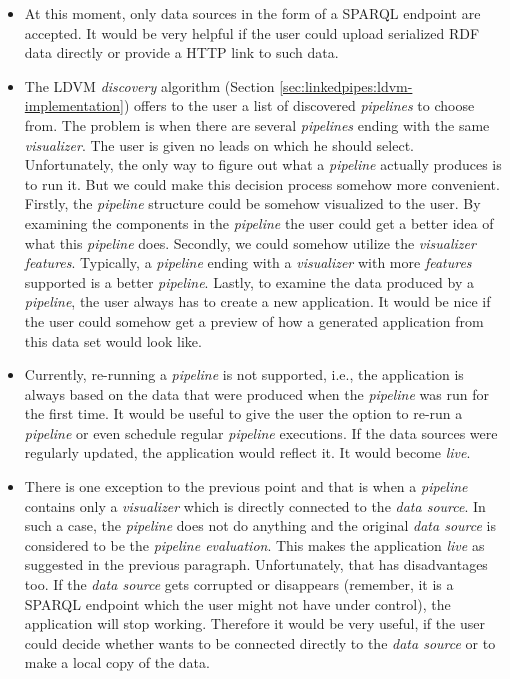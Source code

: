 \begin{itemize}
\item At this moment, only data sources in the form of a SPARQL endpoint are accepted. It would be very helpful if the user could upload serialized RDF data directly or provide a HTTP link to such data.
\item The LDVM \emph{discovery} algorithm (Section \ref{sec:linkedpipes:ldvm-implementation}) offers to the user a list of discovered \emph{pipelines} to choose from. The problem is when there are several \emph{pipelines} ending with the same \emph{visualizer}. The user is given no leads on which he should select. Unfortunately, the only way to figure out what a \emph{pipeline} actually produces is to run it. But we could make this decision process somehow more convenient. Firstly, the \emph{pipeline} structure could be somehow visualized to the user. By examining the components in the \emph{pipeline} the user could get a better idea of what this \emph{pipeline} does. Secondly, we could somehow utilize the \emph{visualizer features}. Typically, a \emph{pipeline} ending with a \emph{visualizer} with more \emph{features} supported is a better \emph{pipeline}. Lastly, to examine the data produced by a \emph{pipeline}, the user always has to create a new application. It would be nice if the user could somehow get a preview of how a generated application from this data set would look like.
\item Currently, re-running a \emph{pipeline} is not supported, i.e., the application is always based on the data that were produced when the \emph{pipeline} was run for the first time. It would be useful to give the user the option to re-run a \emph{pipeline} or even schedule regular \emph{pipeline} executions. If the data sources were regularly updated, the application would reflect it. It would become \emph{live}.
\item There is one exception to the previous point and that is when a \emph{pipeline} contains only a \emph{visualizer} which is directly connected to the \emph{data source}. In such a case, the \emph{pipeline} does not do anything and the original \emph{data source} is considered to be the \emph{pipeline evaluation}. This makes the application \emph{live} as suggested in the previous paragraph. Unfortunately, that has disadvantages too. If the \emph{data source} gets corrupted or disappears (remember, it is a SPARQL endpoint which the user might not have under control), the application will stop working. Therefore it would be very useful, if the user could decide whether wants to be connected directly to the \emph{data source} or to make a local copy of the data.
\end{itemize}

